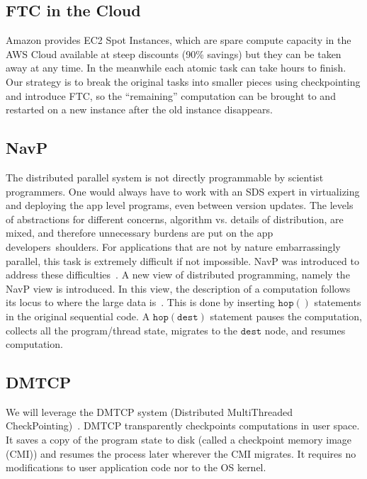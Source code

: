 \documentclass[conference]{IEEEtran}
\begin{document}
\subsection{FTC in the Cloud}
\label{subsec:s11}

Amazon provides EC2 Spot Instances, which are spare compute capacity in the AWS Cloud available at steep discounts (90\% savings) but they can be taken away at any time. In the meanwhile each atomic task can take hours to finish. Our strategy is to break the original tasks into smaller pieces using checkpointing and introduce FTC, so the ``remaining'' computation can be brought to and restarted on a new instance after the old instance disappears.

\subsection{NavP}
\label{subsec:s12}

The distributed parallel system is not directly programmable by scientist programmers. One would always have to work with an SDS expert in virtualizing and deploying the app level programs, even between version updates. The levels of abstractions for different concerns, algorithm vs. details of distribution, are mixed, and therefore unnecessary burdens are put on the app developers\textquotesingle\ shoulders. For applications that are not by nature embarrassingly parallel, this task is extremely difficult if not impossible. NavP was introduced to address these difficulties~\cite{pan2004navp}. A new view of distributed programming, namely the NavP view is introduced. In this view, the description of a computation follows its locus to where the large data is~\cite{pan_views_PDCS03}. This is done by inserting  $\mathtt{hop()}$ statements in the original sequential code. A $\mathtt{hop(dest)}$ statement pauses the computation, collects all the program/thread state, migrates to the $\mathtt{dest}$ node, and resumes computation.

\subsection{DMTCP}
\label{subsec:s13}

We will leverage the DMTCP system (Distributed MultiThreaded CheckPointing)~\cite{ansel2009dmtcp}. DMTCP transparently checkpoints computations in user space. It saves a copy of the program state to disk (called a checkpoint memory image (CMI)) and resumes the process later wherever the CMI migrates. It requires no modifications to user application code nor to the OS kernel.
\end{document}
